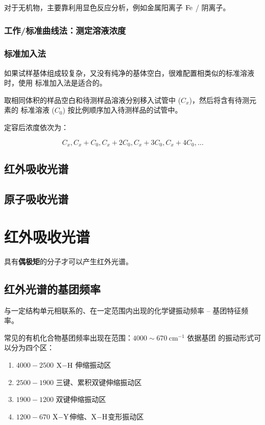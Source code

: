 对于无机物，主要靠利用显色反应分析，例如金属阳离子 $\ce{Fe}$ / 阴离子。

\subsubsection{工作/标准曲线法：测定溶液浓度}

\subsubsection{标准加入法}

如果试样基体组成较复杂，又没有纯净的基体空白，很难配置相类似的标准溶液时，使用
标准加入法是适合的。

取相同体积的样品空白和待测样品溶液分别移入试管中 ($C_x$)，然后将含有待测元素的
标准溶液 ($C_0$) 按比例顺序加入待测样品的试管中。

定容后浓度依次为：

\begin{equation}
    C_x, C_x + C_0, C_x + 2C_0, C_x + 3C_0, C_x + 4C_0, \dots
\end{equation}

\subsection{红外吸收光谱}

\subsection{原子吸收光谱}

\section{红外吸收光谱}

具有\textbf{偶极矩}的分子才可以产生红外光谱。

\subsection{红外光谱的基团频率}

与一定结构单元相联系的、在一定范围内出现的化学键振动频率 -- 基团特征频率。

常见的有机化合物基团频率出现在范围：$4000 \sim 670 \ \mathrm{cm}^{-1}$ 依据基团
的振动形式可以分为四个区：

\begin{enumerate}
    \item $4000 - 2500$ $\ce{X-H}$ 伸缩振动区
    \item $2500 - 1900$ 三键、累积双键伸缩振动区
    \item $1900 - 1200$ 双键伸缩振动区
    \item $1200 - 670$ $\ce{X-Y}$伸缩、$\ce{X-H}$变形振动区
\end{enumerate}


